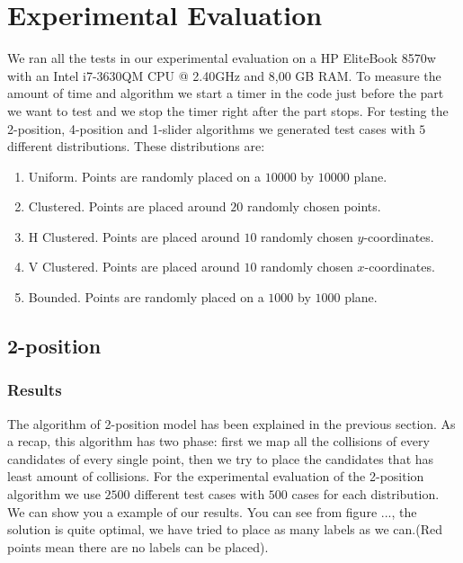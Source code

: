 \documentclass[crop=false,a4paper,oneside,11pt]{standalone}
\begin{document}
\section{Experimental Evaluation}

We ran all the tests in our experimental evaluation on a HP EliteBook 8570w with an Intel i7-3630QM CPU @ 2.40GHz and 8,00 GB RAM. To measure the amount of time and algorithm we start a timer in the code just before the part we want to test and we stop the timer right after the part stops. For testing the 2-position, 4-position and 1-slider algorithms we generated test cases with $5$ different distributions. These distributions are:
\begin{enumerate}
    \item Uniform. Points are randomly placed on a $10000$ by $10000$ plane.
    \item Clustered. Points are placed around $20$ randomly chosen points.
    \item H Clustered. Points are placed around $10$ randomly chosen $y$-coordinates.
    \item V Clustered. Points are placed around $10$ randomly chosen $x$-coordinates.
    \item Bounded. Points are randomly placed on a $1000$ by $1000$ plane.
\end{enumerate}

\subsection{2-position}
\subsubsection{Results}
The algorithm of 2-position model has been explained in the previous section. As a recap, this algorithm has two phase: first we map all the collisions of every candidates of every single point, then we try to place the candidates that has least amount of collisions. For the experimental evaluation of the 2-position algorithm we use $2500$ different test cases with $500$ cases for each distribution. We can show you a example of our results. You can see from figure ..., the solution is quite optimal, we have tried to place as many labels as we can.(Red points mean there are no labels can be placed). 
\end{document}
